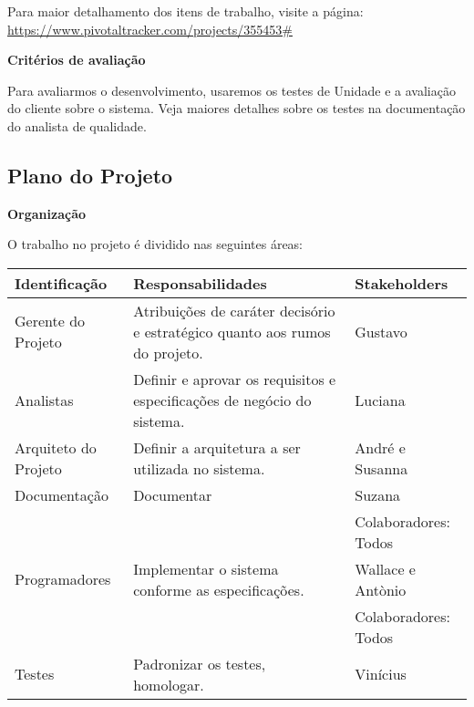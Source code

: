 \documentclass[12pt,letterpaper]{article}
\begin{document}
\bigskip

Para maior detalhamento dos itens de trabalho, visite a página: 
\url{https://www.pivotaltracker.com/projects/355453#}

\vspace{1cm}
{\large {\bf Critérios de avaliação}}
\vspace{0.5cm}

Para avaliarmos o desenvolvimento, usaremos os testes de Unidade e a avaliação do cliente sobre o sistema.
Veja maiores detalhes sobre os testes na documentação do analista de qualidade.

\pagebreak

\subsection{Plano do Projeto}

\vspace{1cm}
{\large {\bf Organização}}
\vspace{0.5cm}

O trabalho no projeto é dividido nas seguintes áreas:

\begin{table}[ht!]
\begin{small} %
    \begin{tabular}{| l | p{7cm} | p{5cm} |}
    \hline
    Identificação & Responsabilidades & Stakeholders\\
    \hline
    \hline
    Gerente do Projeto &
    Atribuições de caráter decisório e estratégico quanto aos rumos do projeto. &
    Gustavo\\
    \hline
    Analistas &
    Definir e aprovar os requisitos e especificações de negócio do sistema. &
    Luciana\\
    \hline
    Arquiteto do Projeto &
    Definir a arquitetura a ser utilizada no sistema. &
    André e Susanna\\
    \hline
    Documentação &
    Documentar &
    Suzana\\
    & & Colaboradores: Todos\\
    \hline
    Programadores &
    Implementar o sistema conforme as especificações. &
    Wallace e Antònio\\
    & & Colaboradores: Todos\\
    \hline
    Testes &
    Padronizar os testes, homologar. &
    Vinícius\\
    \hline
    \end{tabular}
\end{small}
\end{table}
\end{document}
